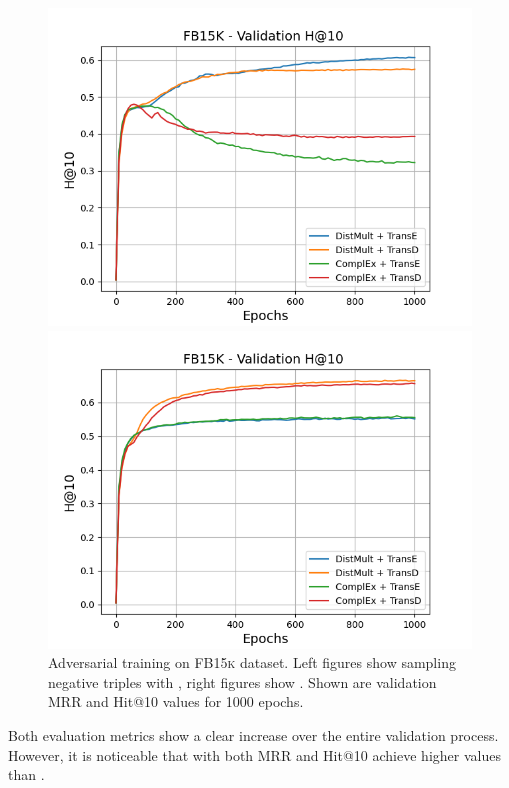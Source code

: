 \begin{figure}[H]
\begin{minipage}{.5\textwidth}
    \end{minipage}
    \begin{minipage}{.5\textwidth}
      \centering
      \includegraphics[width=0.9\linewidth]{figures/results/gan_train/not_pretrained/uncertainty/max/entropy/fb15k/1k_epochs/uncertainty_fb15k_hit10.png}
    \end{minipage}%
    \begin{minipage}{.5\textwidth}
      \centering
      \includegraphics[width=0.9\linewidth]{figures/results/gan_train/not_pretrained/uncertainty/max_distribution/entropy/fb15k/1k_epochs/uncertainty_fb15k_hit10.png}
    \end{minipage}%
    \caption{Adversarial training on \textsc{FB15k} dataset. 
    Left figures show sampling negative triples with \usmax, right figures show \ussoftmax.
    Shown are validation MRR and Hit@10 values for 1000 epochs.}
    \label{fig:advtrain_fb15k_usmax_ussoftmax}
\end{figure}
Both evaluation metrics show a clear increase over the entire validation process.
However, it is noticeable that with \ussoftmax both MRR and Hit@10 achieve higher values than \usmax.

